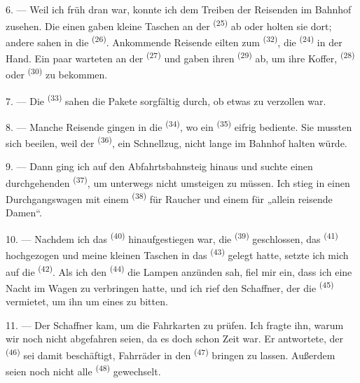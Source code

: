 6. --- Weil ich früh dran war, konnte ich dem Treiben der Reisenden im Bahnhof
zusehen. Die einen gaben kleine Taschen an der 
\textsuperscript{(25)} ab oder holten sie dort; andere sahen in die
 \textsuperscript{(26)}. Ankommende Reisende eilten zum 
\textsuperscript{(32)}, die  \textsuperscript{(24)} in der
Hand. Ein paar warteten an der 
\textsuperscript{(27)} und gaben ihren  \textsuperscript{(29)} ab, um
ihre Koffer,  \textsuperscript{(28)} oder 
\textsuperscript{(30)} zu bekommen.

7. --- Die  \textsuperscript{(33)} sahen die Pakete sorgfältig
durch, ob etwas zu verzollen war.

8. --- Manche Reisende gingen in die 
\textsuperscript{(34)}, wo ein  \textsuperscript{(35)} eifrig
bediente. Sie mussten sich beeilen, weil der  \textsuperscript{(36)}, ein
Schnellzug, nicht lange im Bahnhof halten würde.

9. --- Dann ging ich auf den Abfahrtsbahnsteig hinaus und suchte einen
durchgehenden  \textsuperscript{(37)}, um unterwegs nicht umsteigen zu
müssen. Ich stieg in einen Durchgangswagen mit einem 
\textsuperscript{(38)} für Raucher und einem für „allein reisende Damen“.

\VUsaut{3.0mm}

10. --- Nachdem ich das  \textsuperscript{(40)} hinaufgestiegen
war, die  \textsuperscript{(39)} geschlossen, das 
\textsuperscript{(41)} hochgezogen und meine kleinen Taschen in das
 \textsuperscript{(43)} gelegt hatte, setzte ich mich auf die
 \textsuperscript{(42)}. Als ich den 
\textsuperscript{(44)} die Lampen anzünden sah, fiel mir ein, dass ich eine Nacht im
Wagen zu verbringen hatte, und ich rief den Schaffner, der die 
\textsuperscript{(45)} vermietet, um ihn um eines zu bitten.

11. --- Der Schaffner kam, um die Fahrkarten zu prüfen. Ich fragte ihn, warum wir
noch nicht abgefahren seien, da es doch schon Zeit war. Er antwortete, der
 \textsuperscript{(46)} sei damit beschäftigt, Fahrräder in den
 \textsuperscript{(47)} bringen zu lassen. Außerdem seien noch
nicht alle  \textsuperscript{(48)} gewechselt.

